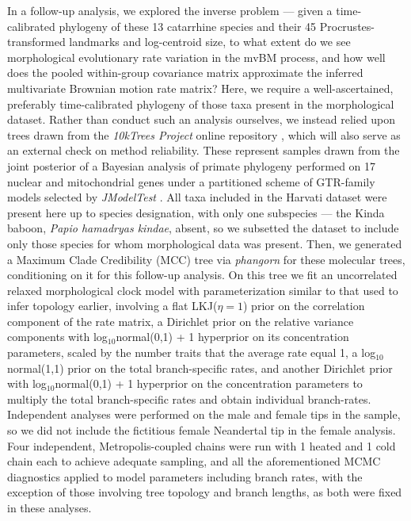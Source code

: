 In a follow-up analysis, we explored the inverse problem --- given a time-calibrated phylogeny of these 13 catarrhine species and their 45 Procrustes-transformed landmarks and log-centroid size, to what extent do we see morphological evolutionary rate variation in the mvBM process, and how well does the pooled within-group covariance matrix approximate the inferred multivariate Brownian motion rate matrix? Here, we require a well-ascertained, preferably time-calibrated phylogeny of those taxa present in the morphological dataset. Rather than conduct such an analysis ourselves, we instead relied upon trees drawn from the \emph{10kTrees Project} online repository \citep{arnold10kTreesWebsiteNew2010}, which will also serve as an external check on method reliability. These represent samples drawn from the joint posterior of a Bayesian analysis of primate phylogeny performed on 17 nuclear and mitochondrial genes under a partitioned scheme of GTR-family models selected by \emph{JModelTest} \citep{posadaJModelTestPhylogeneticModel2008}. All taxa included in the Harvati dataset were present here up to species designation, with only one subspecies --- the Kinda baboon, \emph{Papio hamadryas kindae}, absent, so we subsetted the dataset to include only those species for whom morphological data was present. Then, we generated a Maximum Clade Credibility (MCC) tree via \textit{phangorn} \citep{schliepPhangornPhylogeneticAnalysis2011} for these molecular trees, conditioning on it for this follow-up analysis. On this tree we fit an uncorrelated relaxed morphological clock model with parameterization similar to that used to infer topology earlier, involving a flat LKJ($\eta = 1$) prior on the correlation component of the rate matrix, a Dirichlet prior on the relative variance components with log$_{10}$normal(0,1) + 1 hyperprior on its concentration parameters, scaled by the number traits that the average rate equal 1, a log$_{10}$normal(1,1) prior on the total branch-specific rates, and another Dirichlet prior with log$_{10}$normal(0,1) + 1 hyperprior on the concentration parameters to multiply the total branch-specific rates and obtain individual branch-rates. Independent analyses were performed on the male and female tips in the sample, so we did not include the fictitious female Neandertal tip in the female analysis. Four independent, Metropolis-coupled chains were run with 1 heated and 1 cold chain each to achieve adequate sampling, and all the aforementioned MCMC diagnostics applied to model parameters including branch rates, with the exception of those involving tree topology and branch lengths, as both were fixed in these analyses. 

